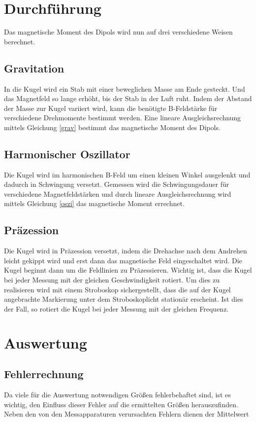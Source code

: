 \section{Durchführung}
Das magnetische Moment des Dipols wird nun auf drei verschiedene Weisen berechnet.


\subsection{Gravitation}
In die Kugel wird ein Stab mit einer beweglichen Masse am Ende gesteckt. Und das Magnetfeld so lange erhöht, bis der Stab in der Luft ruht. Indem der Abstand der Masse zur Kugel variiert wird, kann die benötigte B-Feldstärke für verschiedene Drehmomente bestimmt werden. Eine lineare Ausgleichsrechnung mittels Gleichung \eqref{grav} bestimmt das magnetische Moment des Dipols.
\subsection{Harmonischer Oszillator}
Die Kugel wird im harmonischen B-Feld um einen kleinen Winkel ausgelenkt und dadurch in Schwingung versetzt.
Gemessen wird die Schwingungsdauer für verschiedene Magnetfeldstärken und durch lineare Ausgleichsrechnung wird mittels Gleichung \eqref{oszi} das magnetische Moment errechnet.
\subsection{Präzession}
Die Kugel wird in Präzession versetzt, indem die Drehachse nach dem Andrehen leicht gekippt wird und erst dann das magnetische Feld eingeschaltet wird. Die Kugel beginnt dann um die Feldlinien zu Präzessieren. Wichtig ist, dass die Kugel bei jeder Messung mit der gleichen Geschwindigkeit rotiert. Um dies zu realisieren wird mit einem Stroboskop sichergestellt, dass die auf der Kugel angebrachte Markierung unter dem Stroboskoplicht stationär erscheint. Ist dies der Fall, so rotiert die Kugel bei jeder Messung mit der gleichen Frequenz.  

\section{Auswertung}
\subsection{Fehlerrechnung}
Da viele für die Auswertung notwendigen Größen fehlerbehaftet sind, ist es wichtig, den Einfluss dieser Fehler auf die ermittelten
Größen herauszufinden. Neben den von den Messapparaturen verursachten Fehlern dienen der Mittelwert


